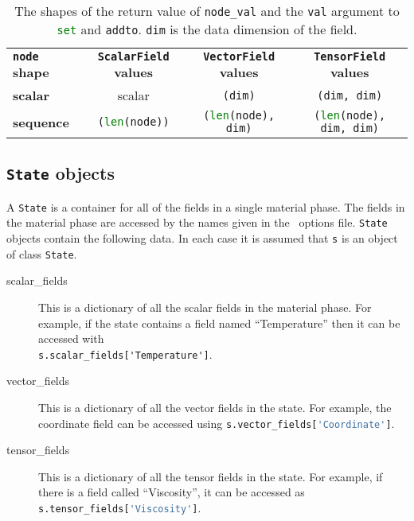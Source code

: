 \begin{table}
\centering

\begin{tabular}{lccc}
  \textbf{\lstinline[language=Python]+node+ shape}
  &\textbf{\lstinline[language=Python]+ScalarField+ values} & 
  \textbf{\lstinline[language=Python]+VectorField+ values} & 
  \textbf{\lstinline[language=Python]+TensorField+ values}\\
  \textbf{scalar} &
scalar& \lstinline[language=Python]+(dim)+ &\lstinline[language=Python]+(dim, dim)+ \\
  \textbf{sequence} &
\lstinline[language=Python]+(len(node))+&
\lstinline[language=Python]+(len(node), dim)+&
\lstinline[language=Python]+(len(node), dim, dim)+\\
\end{tabular}

\caption{The shapes of the return value of \lstinline[language=Python]+node_val+ and the
\lstinline[language=Python]+val+ argument to
\lstinline[language=Python]+set+ and
\lstinline[language=Python]+addto+. \lstinline[language=Python]+dim+ is the
data dimension of the field.
}
\end{table}

\subsection{\lstinline[language=Python]+State+ objects}

A \lstinline[language=Python]+State+ is a container for all of the fields in
a single material phase. The fields in the material phase are accessed by
the names given in the \fluidity\ options file.
\lstinline[language=Python]+State+ objects contain the following data. In
each case it is assumed that \lstinline[language=Python]+s+ is an object of
class \lstinline[language=Python]+State+.

\begin{description}
\item[scalar\_fields] This is a dictionary of all the scalar fields in the
  material phase. For example, if the state contains a field named
  ``Temperature'' then it can be accessed with\\
  \lstinline+s.scalar_fields['Temperature']+.
\item[vector\_fields] This is a dictionary of all the vector fields in the
  state. For example, the coordinate field can be accessed using
  \lstinline[language=Python]+s.vector_fields['Coordinate']+.
\item[tensor\_fields] This is a dictionary of all the tensor fields in the
  state. For example, if there is a field called ``Viscosity'', it can be
  accessed as \lstinline[language=Python]+s.tensor_fields['Viscosity']+.
\end{description}

